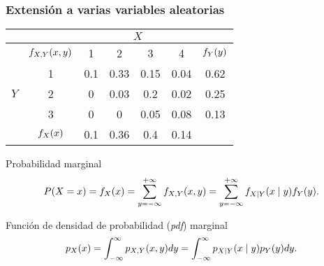 \documentclass[table]{beamer}
\begin{document}
\begin{frame}
    \frametitle{Extensión a varias variables aleatorias}
    \begin{center}
        \small
        \begin{tabular}{c|c|cccc|c}
            & & \multicolumn{4}{c|}{$X$} & \\
            \hline
            & $\pff{X, Y}{x, y}$ & 1 & 2 & 3 & 4 & $\pff{Y}{y}$ \\
            \hline
            & 1 & 0.1 & 0.33 & 0.15 & 0.04 & 0.62 \\
            $Y$ & 2 & 0 & 0.03 & 0.2 & 0.02 & 0.25 \\
            & 3 & 0 & 0 & 0.05 & 0.08 & 0.13 \\
            \hline
            & $\pff{X}{x}$ & 0.1 & 0.36 & 0.4 & 0.14 &
        \end{tabular}
    \end{center}
    \begin{block}{Probabilidad marginal}
        \begin{equation*}
            \prob{X = x} = \pff{X}{x} = \sum_{y = - \infty}^{+ \infty} \pff{X, Y}{x, y}
            = \sum_{y = - \infty}^{+ \infty} \pff{X \mid Y}{x \mid y} \pff{Y}{y} .
        \end{equation*}
    \end{block}
    \begin{block}{Función de densidad de probabilidad (\emph{pdf}) marginal}
        \begin{equation*}
            \ppdf{X}{x} = \int_{- \infty}^{\infty} \ppdf{X, Y}{x, y} d y
            = \int_{- \infty}^{\infty} \ppdf{X \mid Y}{x \mid y} \ppdf{Y}{y} d y .
        \end{equation*}
    \end{block}
\end{frame}
\end{document}
